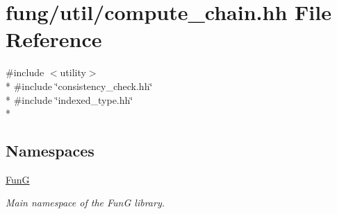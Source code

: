 \hypertarget{compute__chain_8hh}{}\section{fung/util/compute\+\_\+chain.hh File Reference}
\label{compute__chain_8hh}
{\ttfamily \#include $<$utility$>$}\\*
{\ttfamily \#include \char`\"{}consistency\+\_\+check.\+hh\char`\"{}}\\*
{\ttfamily \#include \char`\"{}indexed\+\_\+type.\+hh\char`\"{}}\\*
\subsection*{Namespaces}
\begin{DoxyCompactItemize}
\item 
 \hyperlink{namespaceFunG}{Fun\+G}
\begin{DoxyCompactList}\small\item\em Main namespace of the Fun\+G library. \end{DoxyCompactList}\end{DoxyCompactItemize}
